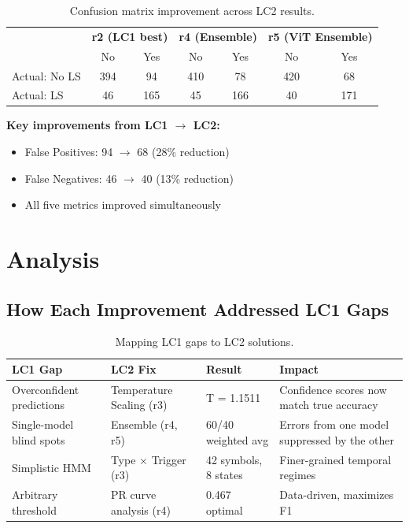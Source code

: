 \documentclass[11pt]{article}
\begin{document}
\begin{table}[H]
    \centering
    \renewcommand{\arraystretch}{1.2}
    \begin{tabular}{l|cc|cc|cc}
        \toprule
         & \multicolumn{2}{c|}{\textbf{r2 (LC1 best)}} & \multicolumn{2}{c|}{\textbf{r4 (Ensemble)}} & \multicolumn{2}{c}{\textbf{r5 (ViT Ensemble)}} \\
         & No & Yes & No & Yes & No & Yes \\
        \midrule
        Actual: No LS & 394 & 94 & 410 & 78 & 420 & 68 \\
        Actual: LS    & 46  & 165 & 45  & 166 & 40  & 171 \\
        \bottomrule
    \end{tabular}
    \caption{Confusion matrix improvement across LC2 results.}
\end{table}

\noindent \textbf{Key improvements from LC1 $\to$ LC2:}
\begin{itemize}[noitemsep]
    \item False Positives: 94 $\to$ 68 (28\% reduction)
    \item False Negatives: 46 $\to$ 40 (13\% reduction)
    \item All five metrics improved simultaneously
\end{itemize}

\section{Analysis}

\subsection{How Each Improvement Addressed LC1 Gaps}

\begin{table}[H]
    \centering
    \renewcommand{\arraystretch}{1.3}
    \begin{tabularx}{\textwidth}{lllX}
        \toprule
        \textbf{LC1 Gap} & \textbf{LC2 Fix} & \textbf{Result} & \textbf{Impact} \\
        \midrule
        Overconfident predictions & Temperature Scaling (r3) & T = 1.1511 & Confidence scores now match true accuracy \\
        Single-model blind spots & Ensemble (r4, r5) & 60/40 weighted avg & Errors from one model suppressed by the other \\
        Simplistic HMM & Type $\times$ Trigger (r3) & 42 symbols, 8 states & Finer-grained temporal regimes \\
        Arbitrary threshold & PR curve analysis (r4) & 0.467 optimal & Data-driven, maximizes F1 \\
        \bottomrule
    \end{tabularx}
    \caption{Mapping LC1 gaps to LC2 solutions.}
\end{table}
\end{document}
